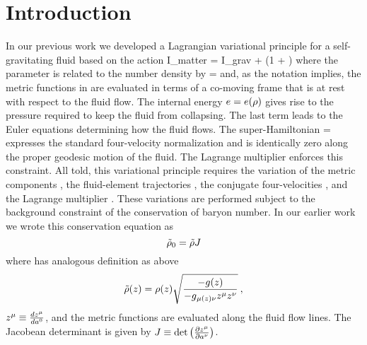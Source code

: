 \section{Introduction}

In our previous work we developed a Lagrangian variational
principle for a self-gravitating fluid based on the action \bes
I_{matter} = I_{grav} +  \gtro (1 + \erg) \surb{
\pdtraj{\gm} \pvel{\gm} - \gL \mH} \eqc \ees where the parameter
\gtro is related to the number density \gr by \bes
  \gtro = \gr \contarg {}
\ees and, as the notation implies, the metric functions in \gtro
are evaluated in terms of a co-moving frame that is at rest with
respect to the fluid flow. The internal energy $e = e(\rho)$ gives
rise to the pressure required to keep the fluid from collapsing.
The last term leads to the Euler equations determining how the
fluid flows.  The super-Hamiltonian \bes
  \mH = 
\ees expresses the standard four-velocity normalization and is
identically zero along the proper geodesic motion \ptraj{\gm} of
the fluid. The Lagrange multiplier \gL enforces this constraint.
All told, this variational principle requires the variation of the
metric components \imet{\gm}{\gn}, the fluid-element trajectories
\ptraj{\gn}, the conjugate four-velocities \pvel{\gm}, and the
Lagrange multiplier \gL \back. These variations are performed
subject to the background constraint of the conservation of baryon
number. In our earlier work we wrote this conservation equation as
\[
   {\tilde \rho}{{}_{0} }  = \tilde \rho J
\]
where \gtr has analogous definition as \gtro  above
\[
\tilde \rho(z) = \rho(z) \sqrt{\frac{- g (z)}{- {g}{{}_{\mu(z) \nu} } 
 {z}{{}^{\mu} }   {z}{{}^{\nu} } }} \: ,
\]
$ {z}{{}^{\mu} }  \equiv \frac{d z^{\mu}}{d a^0}$, and the metric
functions are evaluated along the fluid flow lines. The Jacobean
determinant is given by $J \equiv \det \left( { \frac{\partial
z^{\mu}}{\partial a^{\nu}}} \right)$.

